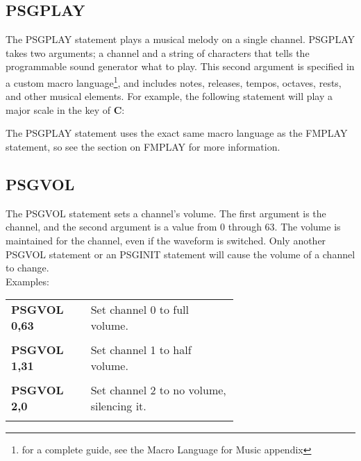 \subsection{PSGPLAY}

The {\ttfamily PSGPLAY} statement plays a musical melody on a single channel.
{\ttfamily PSGPLAY} takes two arguments; a channel and a string of characters
that tells the programmable sound generator what to play.  This second argument
is specified in a custom macro language\footnote{for a complete guide, see the
Macro Language for Music appendix}, and includes notes, releases, tempos,
octaves, rests, and other musical elements.  For example, the following
statement will play a major scale in the key of {\ttfamily\bfseries C}:\\


The {\ttfamily PSGPLAY} statement uses the exact same macro language as the
{\ttfamily FMPLAY} statement, so see the section on {\ttfamily FMPLAY} for more
information.

\subsection{PSGVOL}

The {\ttfamily PSGVOL} statement sets a channel's volume.  The first argument
is the channel, and the second argument is a value from 0 through 63.  The
volume is maintained for the channel, even if the waveform is switched.  Only
another {\ttfamily PSGVOL} statement or an {\ttfamily PSGINIT} statement will
cause the volume of a channel to change.\\

Examples:\\

\begin{tabular}{l p{0.65\linewidth}}

	{\ttfamily\bfseries PSGVOL 0,63}&Set channel 0 to full volume.\\\\

	{\ttfamily\bfseries PSGVOL 1,31}&Set channel 1 to half volume.\\\\

	{\ttfamily\bfseries PSGVOL 2,0}&Set channel 2 to no volume, silencing it.\\\\

\end{tabular}

